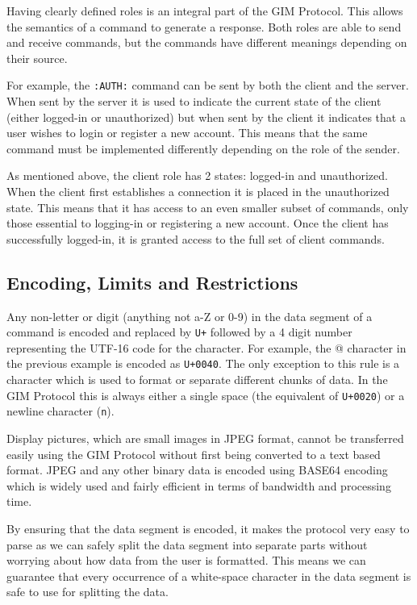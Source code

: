 Having clearly defined roles is an integral part of the GIM Protocol. This allows the semantics of a command to generate a response. Both roles are able to send and receive commands, but the commands have different meanings depending on their source. 

For example, the \texttt{:AUTH:} command can be sent by both the client and the server. When sent by the server it is used to indicate the current state of the client (either logged-in or unauthorized) but when sent by the client it indicates that a user wishes to login or register a new account. This means that the same command must be implemented differently depending on the role of the sender.

As mentioned above, the client role has 2 states: logged-in and unauthorized. When the client first establishes a connection it is placed in the unauthorized state. This means that it has access to an even smaller subset of commands, only those essential to logging-in or registering a new account. Once the client has successfully logged-in, it is granted access to the full set of client commands.


\subsection{Encoding, Limits and Restrictions}
\label{encoding}

Any non-letter or digit (anything not a-Z or 0-9) in the data segment of a command is encoded and replaced by \texttt{\SLASH U+} followed by a 4 digit number representing the UTF-16 code for the character. For example, the @ character in the previous example is encoded as \texttt{\SLASH U+0040}. The only exception to this rule is a character which is used to format or separate different chunks of data. In the GIM Protocol this is always either a single space (the equivalent of \texttt{\SLASH U+0020}) or a newline character (\texttt{\SLASH n}).

Display pictures, which are small images in JPEG format, cannot be transferred easily using the GIM Protocol without first being converted to a text based format. JPEG and any other binary data is encoded using BASE64 encoding which is widely used and fairly efficient in terms of bandwidth and processing time.

By ensuring that the data segment is encoded, it makes the protocol very easy to parse as we can safely split the data segment into separate parts without worrying about how data from the user is formatted. This means we can guarantee that every occurrence of a white-space character in the data segment is safe to use for splitting the data.


